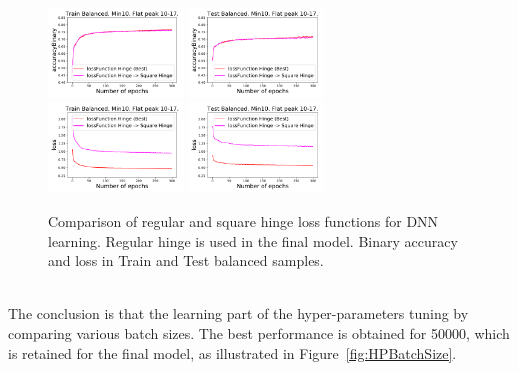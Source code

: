 \begin{figure}[!htb]
\centering
\includegraphics[width=0.32\textwidth]{plots/plot_01_1_overlay_graph_accuracyBinary_Train_LossFunction.pdf}
\includegraphics[width=0.32\textwidth]{plots/plot_01_1_overlay_graph_accuracyBinary_Test_LossFunction.pdf}\\
\includegraphics[width=0.32\textwidth]{plots/plot_01_1_overlay_graph_loss_Train_LossFunction.pdf}
\includegraphics[width=0.32\textwidth]{plots/plot_01_1_overlay_graph_loss_Test_LossFunction.pdf}\\
\caption{Comparison of regular and square hinge loss functions for DNN learning. Regular hinge is used in the final model. Binary accuracy and loss in Train and Test balanced samples.}
\label{fig:HPLossFunction}
\end{figure}

\ \\The conclusion is that the learning part of the hyper-parameters tuning by comparing various batch sizes. The best performance is obtained for 50000, which is retained for the final model, as illustrated in Figure~\ref{fig:HPBatchSize}.


